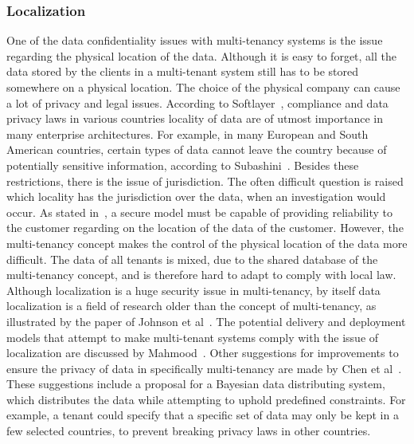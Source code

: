\subsubsection{Localization}
One of the data confidentiality issues with multi-tenancy systems is the issue regarding the physical location of the data. 
Although it is easy to forget, all the data stored by the clients in a multi-tenant system still has to be stored somewhere on a physical location. 
The choice of the physical company can cause a lot of privacy and legal issues. 
According to Softlayer~\cite{Softlayer2009Security}, compliance and data privacy laws in various countries locality of data are of utmost importance in many enterprise architectures. 
For example, in many European and South American countries, certain types of data cannot leave the country because of potentially sensitive information, according to Subashini~\cite{Subashini2010Security}.
Besides these restrictions, there is the issue of jurisdiction.
The often difficult question is raised which locality has the jurisdiction over the data, when an investigation would occur.
As stated in~\cite{Subashini2011Security}, a secure model must be capable of providing reliability to the customer regarding on the location of the data of the customer.
However, the multi-tenancy concept makes the control of the physical location of the data more difficult. The data of all tenants is mixed, due to the shared database of the multi-tenancy concept, and is therefore hard to adapt to comply with local law.\\

Although localization is a huge security issue in multi-tenancy, by itself data localization is a field of research older than the concept of multi-tenancy, as illustrated by the paper of Johnson et al~\cite{Johnson1996Law}. 
The potential delivery and deployment models that attempt to make multi-tenant systems comply with the issue of localization are discussed by Mahmood~\cite{Mahmood2011Security}.
Other suggestions for improvements to ensure the privacy of data in specifically multi-tenancy are made by Chen et al~\cite{Chen2012Security}. These suggestions include a proposal for a Bayesian data distributing system, which distributes the data while attempting to uphold predefined constraints. For example, a tenant could specify that a specific set of data may only be kept in a few selected countries, to prevent breaking privacy laws in other countries. 

